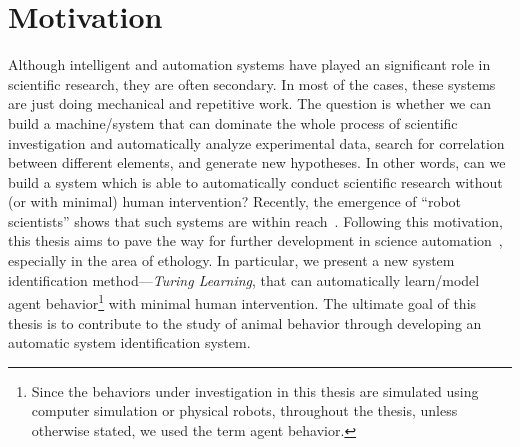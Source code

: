
\section{Motivation}

Although intelligent and automation systems have played an significant role in scientific research, they are often secondary. In most of the cases, these systems are just doing mechanical and repetitive work. The question is whether we can build a machine/system that can dominate the whole process of scientific investigation and automatically analyze experimental data, search for correlation between different elements, and generate new hypotheses. In other words, can we build a system which is able to automatically conduct scientific research without (or with minimal) human intervention? Recently, the emergence of ``robot scientists'' shows that such systems are within reach~\cite{King_2009, Evans_2010, Waltz2010}. Following this motivation, this thesis aims to pave the way for further development in science automation~\cite{Evans_2010}, especially in the area of ethology. In particular, we present a new system identification method---\textit{Turing Learning}, that can automatically learn/model agent behavior\footnote{Since the behaviors under investigation in this thesis are simulated using computer simulation or physical robots, throughout the thesis, unless otherwise stated, we used the term agent behavior.} with minimal human intervention. The ultimate goal of this thesis is to contribute to the study of animal behavior through developing an automatic system identification system.

